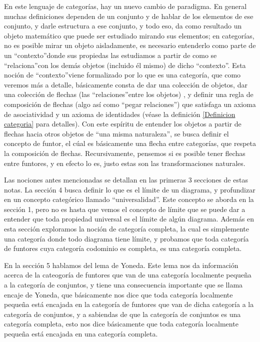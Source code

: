 \documentclass{comunicaciones}
\begin{document}
En este lenguaje de categorías, hay un nuevo cambio de paradigma. En general muchas definiciones dependen de un conjunto y de hablar de los elementos de ese conjunto, y darle estructura a ese conjunto, y todo eso, da como resultado un objeto matemático que puede ser estudiado mirando sus elementos; en categorías, no es posible mirar un objeto aisladamente, es necesario entenderlo como parte de un \textquotedblleft contexto\textquotedblright  donde sus propiedas las estudiamos a partir de como se \textquotedblleft relaciona\textquotedblright con los demás objetos (incluido él mismo) de dicho \textquotedblleft contexto\textquotedblright . Esta noción de \textquotedblleft contexto\textquotedblright  viene formalizado por lo que es una categoría, que como veremos más a detalle, básicamente consta de dar una colección de objetos, dar una colección de flechas (las \textquotedblleft relaciones\textquotedblright  entre los objetos) , y definir una regla de composición de flechas (algo así como \textquotedblleft pegar relaciones\textquotedblright ) que satisfaga un axioma de asociatividad y un axioma de identidades (véase la definición \ref{Definicion categoria} para detalles). Con este espíritu de entender los objetos a partir de flechas hacia otros objetos de \textquotedblleft una misma naturaleza\textquotedblright , se busca definir el concepto de funtor, el cúal es básicamente una flecha entre categorías, que respeta la composición de flechas. Recursivamente, pensemos si es posible tener
flechas entre funtores, y en efecto lo es,  justo estas son las transformaciones naturales.

Las nociones antes mencionadas se detallan en las primeras 3 secciones de estas notas. La sección 4 busca definir lo que es el límite de un diagrama, y profundizar en un concepto categórico llamado \textquotedblleft universalidad\textquotedblright . Este concepto se aborda en la sección 1, pero no es hasta que vemos el concepto de límite que se puede dar a entender que toda propiedad universal es el límite de algún diagrama. Además en esta sección exploramos la noción de categoría completa, la cual es simplemente una categoría donde todo diagrama tiene límite, y probamos que toda categoría de funtores cuya categoría codominio es completa, es una categoría completa.

En la sección 5  hablamos del lema de Yoneda. Este lema nos da información acerca de la cateogoría de funtores que van de una categoría localmente pequeña a la categoría de conjuntos, y tiene una consecuencia importante que se llama encaje de Yoneda, que básicamente nos dice que toda categoría localmente pequeña está encajada en la categoría de funtores que van de dicha categoría a la categoría de conjuntos, y a sabiendas de que la categoría de conjuntos es una categoría completa, esto nos dice básicamente que toda categoría localmente pequeña está encajada en una categoría completa.
\end{document}
